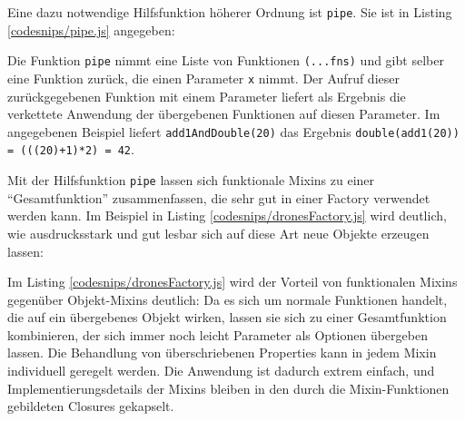 Eine dazu notwendige Hilfsfunktion höherer Ordnung ist \texttt{pipe}. Sie ist in Listing \ref{codesnips/pipe.js} angegeben:


Die Funktion \texttt{pipe} nimmt eine Liste von Funktionen \texttt{(...fns)} und gibt selber eine Funktion zurück, die einen Parameter \texttt{x} nimmt. Der Aufruf dieser zurückgegebenen Funktion mit einem Parameter liefert als Ergebnis die verkettete Anwendung der übergebenen Funktionen auf diesen Parameter. Im angegebenen Beispiel liefert \texttt{add1AndDouble(20)} das Ergebnis \texttt{double(add1(20)) = (((20)+1)*2) = 42}.

Mit der Hilfsfunktion \texttt{pipe} lassen sich funktionale Mixins zu einer "`Gesamtfunktion"' zusammenfassen, die sehr gut in einer Factory verwendet werden kann.
Im Beispiel in Listing \ref{codesnips/dronesFactory.js} wird deutlich, wie ausdrucksstark und gut lesbar sich auf diese Art neue Objekte erzeugen lassen:

\skippingparagraph


Im Listing \ref{codesnips/dronesFactory.js} wird der Vorteil von funktionalen Mixins gegenüber Objekt-Mixins deutlich: Da es sich um normale Funktionen handelt, die auf ein übergebenes Objekt wirken, lassen sie sich zu einer Gesamtfunktion kombinieren, der sich immer noch leicht Parameter als Optionen übergeben lassen. Die Behandlung von überschriebenen Properties kann in jedem Mixin individuell geregelt werden. Die Anwendung ist dadurch extrem einfach, und Implementierungsdetails der Mixins bleiben in den durch die Mixin-Funktionen gebildeten Closures gekapselt. 

